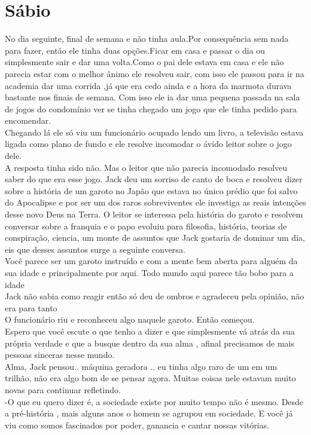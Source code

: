 \documentclass{book}
\begin{document}
\section*{Sábio}
No dia seguinte, final de semana e não tinha aula.Por consequência sem nada para fazer, então ele tinha duas opções.Ficar em casa e passar o dia ou simplesmente sair e dar uma volta.Como o pai dele estava em casa e ele não parecia estar com o melhor ânimo ele resolveu sair, com isso ele passou para ir na academia dar uma corrida ,já que era cedo ainda e a hora da marmota durava bastante nos finais de semana. Com isso ele ia dar uma pequena passada na sala de jogos do condomínio ver se tinha chegado um jogo que ele tinha pedido para encomendar. \\
Chegando lá ele só viu um funcionário ocupado lendo um livro, a televisão estava ligada como plano de fundo e ele resolve incomodar o ávido leitor sobre o jogo dele. \\
A resposta tinha sido não. Mas o leitor que não parecia incomodado resolveu saber do que era esse jogo. Jack deu um sorriso de canto de boca e resolveu dizer sobre a história de um garoto no Japão que estava no único prédio que foi salvo do Apocalipse e por ser um dos raros sobreviventes ele investiga as reais intenções desse novo Deus na Terra. O leitor se interessa pela história do garoto e resolvem conversar sobre a franquia e o papo evoluiu para filosofia, história, teorias de conspiração, ciencia, um monte de assuntos que Jack gostaria de dominar um dia, eis que desses assuntos surge a seguinte conversa.\\
Você parece ser um garoto instruído e com a mente bem aberta para alguém da sua idade e principalmente por aqui. Todo mundo aqui parece tão bobo para a idade\\
Jack não sabia como reagir então só deu de ombros e agradeceu pela opinião, não era para tanto\\
O funcionário riu e reconheceu algo naquele garoto. Então começou.\\
Espero que você escute o que tenho a dizer e que simplesmente vá atrás da sua própria verdade e que a busque dentro da sua alma , afinal precisamos de mais pessoas sinceras nesse mundo.\\
Alma, Jack pensou.. máquina geradora .. eu tinha algo raro de um em um trilhão, não era algo bom de se pensar agora. Muitas coisas nele estavam muito novas para continuar refletindo.\\
-O que eu quero dizer é, a sociedade existe por muito tempo não é mesmo. Desde a pré-história , mais alguns anos o homem se agrupou em sociedade. E você já viu como somos fascinados por poder, ganancia e cantar nossas vitórias.\\
\end{document}
